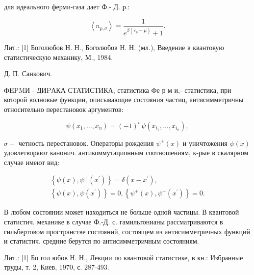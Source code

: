 \documentclass[10pt]{article}
\begin{document}
для идеального ферми-газа дает Ф.- Д. р.:



\[

\left\langle n_{p, \sigma}\right\rangle=\frac{1}{e^{\beta\left(\varepsilon_{p}-\mu\right)}+1} .

\]



Лит.: [1] Боголюбов Н. Н., Боголюбов Н. Н. (мл.), Введение в квантовую статистическую механику, М., 1984.



Д. П. Санкович.



ФEPMИ - ДИPАКА СТАТИСТИКА, статистика Фе р м и,- статистика, при которой волновые функции, описывающие состояния частиц, антисимметричны относительно перестановок аргументов:



\[

\psi\left(x_{1}, \ldots, x_{n}\right)=(-1)^{\sigma} \psi\left(x_{i_{1}}, \ldots, x_{i_{n}}\right),

\]



$\sigma-$ четность перестановок. Операторы рождения $\psi^{+}(x)$ и уничтожения $\psi(x)$ удовлетворяют канонич. антикоммутационным соотношениям, к-рые в скалярном случае имеют вид:



\[

\begin{gathered}

\left\{\psi(x), \psi^{+}\left(x^{\prime}\right)\right\}=\delta\left(x-x^{\prime}\right), \\

\left\{\psi(x), \psi\left(x^{\prime}\right)\right\}=0,\left\{\psi^{+}(x), \psi^{+}\left(x^{\prime}\right)\right\}=0 .

\end{gathered}

\]



В любом состоянии может находиться не больше одной частицы. В квантовой статистич. механике в случае Ф.-Д. с. гамильтонианы рассматриваются в гильбертовом пространстве состояний, состоящем из антисимметричных функций и статистич. средние берутся по антисимметричным состояниям.



Лит.: [1] Бо гол юбов Н. Н., Лекции по квантовой статистике, в кн.: Избранные труды, т. 2, Киев, 1970, с. 287-493.
\end{document}
